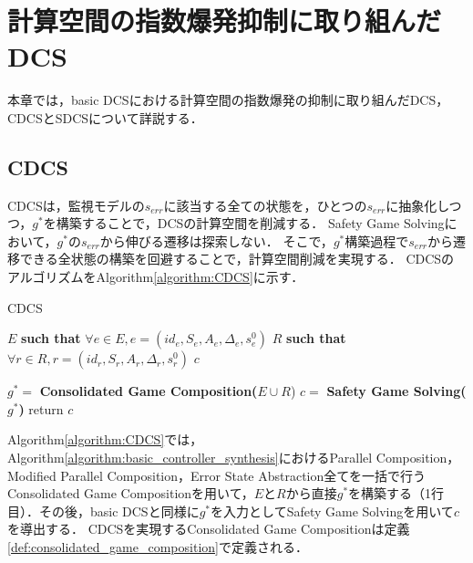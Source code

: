 \section{計算空間の指数爆発抑制に取り組んだDCS}
\label{section:advDCS}
本章では，basic DCSにおける計算空間の指数爆発の抑制に取り組んだDCS，CDCSとSDCSについて詳説する．


\subsection{CDCS}
\label{subsection:CDCS}
CDCS\cite{yamauchi:IPSJ2024}は，監視モデルの$s_{err}$に該当する全ての状態を，ひとつの$s_{err}$に抽象化しつつ，$g^*$を構築することで，DCSの計算空間を削減する．
Safety Game Solvingにおいて，$g^*$の$s_{err}$から伸びる遷移は探索しない．
そこで，$g^*$構築過程で$s_{err}$から遷移できる全状態の構築を回避することで，計算空間削減を実現する．
CDCSのアルゴリズムをAlgorithm\ref{algorithm:CDCS}に示す．

\begin{algorithm}[h]
\caption{CDCS}
\label{algorithm:CDCS}
\begin{algorithmic}[1]
\renewcommand{\algorithmicrequire}{\textbf{Input:}}
\renewcommand{\algorithmicensure}{\textbf{Output:}}
\REQUIRE $E$ {\bf such that} $\forall e \in E, e = (id_{e}, S_{e}, A_{e}, \Delta_{e}, s^0_{e})$
\REQUIRE $R$ {\bf such that} $\forall r \in R, r = (id_{r}, S_{r}, A_{r}, \Delta_{r}, s^0_{r})$
\ENSURE  $c$

\STATE $g^* =$ {\bf Consolidated Game Composition($E \cup R$})
\STATE $c   =$ {\bf Safety Game Solving($g^*$)}
\STATE return $c$
\end{algorithmic}
\end{algorithm}

Algorithm\ref{algorithm:CDCS}では，Algorithm\ref{algorithm:basic_controller_synthesis}におけるParallel Composition，Modified Parallel Composition，Error State Abstraction全てを一括で行うConsolidated Game Compositionを用いて，$E$と$R$から直接$g^*$を構築する（1行目）．その後，basic DCSと同様に$g^*$を入力としてSafety Game Solvingを用いて$c$を導出する．
CDCSを実現するConsolidated Game Compositionは定義\ref{def:consolidated_game_composition}で定義される．

